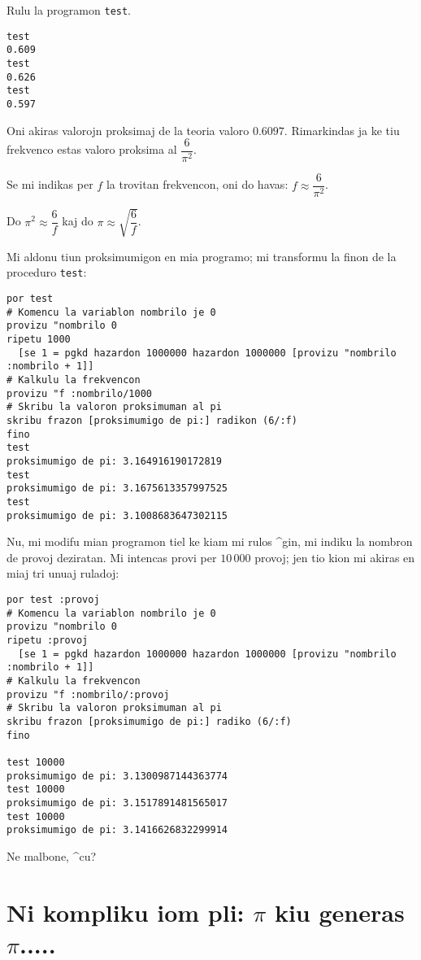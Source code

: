 Rulu la programon \texttt{test}.
\begin{verbatim}
test
0.609
test
0.626
test
0.597
\end{verbatim}
Oni akiras valorojn proksimaj de la teoria valoro $0.6097$.
Rimarkindas ja ke tiu frekvenco estas valoro proksima al
$\dfrac{6}{\pi^2}$.

Se mi indikas per $f$ la trovitan frekvencon, oni do havas: $f\approx
\dfrac{6}{\pi^2}$.

Do $\pi^2\approx\dfrac{6}{f}$ kaj do $\pi\approx\sqrt{\dfrac{6}{f}}$.

Mi aldonu tiun proksimumigon en mia programo; mi transformu la finon
de la proceduro \texttt{test}:

\begin{verbatim}
por test
# Komencu la variablon nombrilo je 0
provizu "nombrilo 0
ripetu 1000  
  [se 1 = pgkd hazardon 1000000 hazardon 1000000 [provizu "nombrilo :nombrilo + 1]]
# Kalkulu la frekvencon 
provizu "f :nombrilo/1000
# Skribu la valoron proksimuman al pi
skribu frazon [proksimumigo de pi:] radikon (6/:f)
fino
test
proksimumigo de pi: 3.164916190172819
test
proksimumigo de pi: 3.1675613357997525
test
proksimumigo de pi: 3.1008683647302115
\end{verbatim}

Nu, mi modifu mian programon tiel ke kiam mi rulos ^gin, mi indiku la
nombron de provoj deziratan.  Mi intencas provi per $10\,000$ provoj;
jen tio kion mi akiras en miaj tri unuaj ruladoj:

\begin{verbatim}
por test :provoj
# Komencu la variablon nombrilo je 0
provizu "nombrilo 0
ripetu :provoj  
  [se 1 = pgkd hazardon 1000000 hazardon 1000000 [provizu "nombrilo :nombrilo + 1]]
# Kalkulu la frekvencon
provizu "f :nombrilo/:provoj
# Skribu la valoron proksimuman al pi
skribu frazon [proksimumigo de pi:] radiko (6/:f)
fino

test 10000
proksimumigo de pi: 3.1300987144363774
test 10000
proksimumigo de pi: 3.1517891481565017
test 10000
proksimumigo de pi: 3.1416626832299914
\end{verbatim} 
Ne malbone, ^cu?

\section{Ni kompliku iom pli: $\pi$ kiu generas $\pi$.....}


